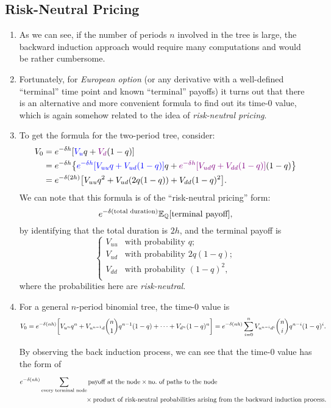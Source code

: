 \subsection{Risk-Neutral Pricing}
\begin{enumerate}
\item As we can see, if the number of periods \(n\) involved in the tree is
large, the backward induction approach would require many computations and
would be rather cumbersome.

\item Fortunately, for \emph{European option} (or any derivative with a
well-defined ``terminal'' time point and known ``terminal'' payoffs) it turns out
that there is an alternative and more convenient formula to find out its time-0
value, which is again somehow related to the idea of \emph{risk-neutral
pricing}.

\item To get the formula for the two-period tree, consider:
\begin{align*}
V_0&=e^{-\delta h}[{\color{blue}V_u}q+{\color{violet}V_d}(1-q)]\\
&=e^{-\delta h}\qty{{\color{blue}e^{-\delta h}[V_{uu}q+V_{ud}(1-q)]}q+{\color{violet}e^{-\delta h}[V_{ud}q+V_{dd}(1-q)]}(1-q)} \\
&=e^{-\delta (2h)}\qty[V_{uu}q^2+V_{ud}(2q(1-q))+V_{dd}(1-q)^2].
\end{align*}
We can note that this formula is of the ``risk-neutral pricing'' form:
\[
e^{-\delta(\text{total duration})}\mathbb{E}_{\mathbb{Q}}\qty[\text{terminal payoff}],
\]
by identifying that the total duration is \(2h\), and the terminal payoff is
\[
\begin{cases}
V_{uu}&\text{with probability \(q\)};\\
V_{ud}&\text{with probability \(2q(1-q)\)};\\
V_{dd}&\text{with probability \((1-q)^{2}\)},\\
\end{cases}
\]
where the probabilities here are \emph{risk-neutral}.

\item \label{it:back-induct-n-period-fmla}
For a general \(n\)-period binomial tree, the time-0 value is
\[
V_0=e^{-\delta(nh)}\qty[V_{u^n}q^n+V_{u^{n-1}d}\binom{n}{1}q^{n-1}(1-q)+\dotsb+V_{d^{n}}(1-q)^{n}]
=e^{-\delta(nh)}\sum_{i=0}^{n}V_{u^{n-i}d^{i}}\binom{n}{i}q^{n-i}(1-q)^{i}.
\]
\begin{pf}
By observing the back induction process, we can see that the time-0 value has
the form of
\begin{align*}
&e^{-\delta(nh)}\sum_{\text{every terminal node}}^{}
\text{payoff at the node}\times\text{no.\ of paths to the node} \\
&\hspace{3.5cm}\times\text{product of risk-neutral probabilities arising from the backward induction process}.
\end{align*}


\end{pf}
\end{enumerate}
